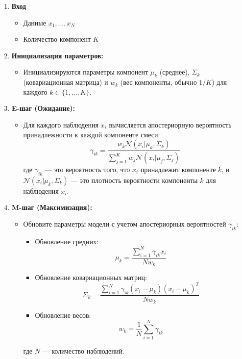 \begin{enumerate}
    \item \textbf{Вход}
          \begin{itemize}
              \item Данные $x_1, \ldots, x_N$
              \item Количество компонент $K$
          \end{itemize}
    \item \textbf{Инициализация параметров:}
          \begin{itemize}
              \item Инициализируются параметры компонент $\mu_k$ (среднее), $\Sigma_k$ (ковариационная матрица) и $w_k$ (вес компоненты, обычно $1/ K$) для каждого $k \in \{1, \dots, K\}$.
          \end{itemize}

    \item \textbf{E-шаг (Ожидание):}
          \begin{itemize}
              \item Для каждого наблюдения $x_i$ вычисляется апостериорную вероятность принадлежности к каждой компоненте смеси:
                    \[
                        \gamma_{ik} = \frac{w_k \mathcal{N}(x_i | \mu_k, \Sigma_k)}{\sum_{j=1}^{K} w_j \mathcal{N}(x_i | \mu_j, \Sigma_j)}
                    \]
                    где $\gamma_{ik}$ — это вероятность того, что $x_i$ принадлежит компоненте $k$, и $\mathcal{N}(x_i | \mu_k, \Sigma_k)$ — это плотность вероятности компоненты $k$ для наблюдения $x_i$.
          \end{itemize}

    \item \textbf{M-шаг (Максимизация):}
          \begin{itemize}
              \item Обновите параметры модели с учетом апостериорных вероятностей $\gamma_{ik}$:
                    \begin{itemize}
                        \item Обновление средних:
                              \[
                                  \mu_k = \frac{\sum_{i=1}^{N} \gamma_{ik} x_i}{Nw_k}
                              \]
                        \item Обновление ковариационных матриц:
                              \[
                                  \Sigma_k = \frac{\sum_{i=1}^{N} \gamma_{ik} (x_i - \mu_k)(x_i - \mu_k)^T}{Nw_k}
                              \]
                        \item Обновление весов:
                              \[
                                  w_k = \frac{1}{N} \sum_{i=1}^{N} \gamma_{ik}
                              \]
                    \end{itemize}
                    где $N$ — количество наблюдений.
          \end{itemize}


\end{enumerate}
